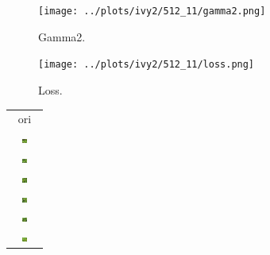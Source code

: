 \documentclass[letter]{article}
\begin{document}
\begin{figure}[h!]
	\centering
	\texttt{[image: ../plots/ivy2/512\_11/gamma2.png]}
	\caption{\label{fig:gamma1}Gamma2.}
\end{figure}

\begin{figure}[h!]
	\centering
	\texttt{[image: ../plots/ivy2/512\_11/loss.png]}
	\caption{\label{fig:gamma1}Loss.}
\end{figure}

\newpage

\begin{table}[h!]
	\centering
	\begin{tabular}{c}
		ori\tabularnewline
		\includegraphics[width=0.17\textwidth]{../data/ivy2/512/1} \tabularnewline		\includegraphics[width=0.17\textwidth]{../data/ivy2/512/2} \tabularnewline		\includegraphics[width=0.17\textwidth]{../data/ivy2/512/3} \tabularnewline		\includegraphics[width=0.17\textwidth]{../data/ivy2/512/4} \tabularnewline		\includegraphics[width=0.17\textwidth]{../data/ivy2/512/5} \tabularnewline		\includegraphics[width=0.17\textwidth]{../data/ivy2/512/6} \tabularnewline

\end{tabular}
\end{table}
\end{document}
